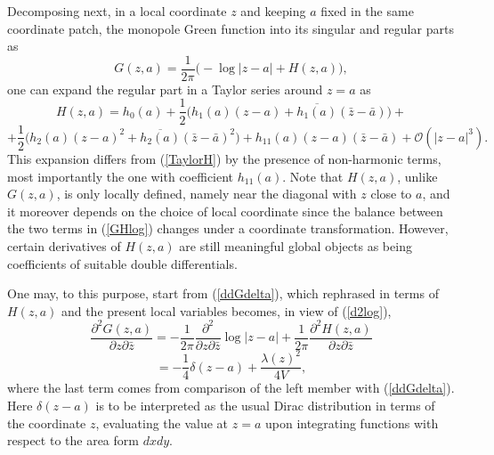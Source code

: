 \documentclass[reqno,12pt]{article}
\theoremstyle{plain}
\theoremstyle{definition}
\numberwithin{equation}{section}
\numberwithin{figure}{section}
\begin{document}
Decomposing next, in a local coordinate $z$ and keeping $a$ fixed in the same coordinate patch,  
the monopole Green function into its singular and regular parts as
\begin{equation}\label{GHlog}
G(z,a)=\frac{1}{2\pi}\Big(-\log |z-a|+H(z,a)\Big),
\end{equation}
one can expand the regular part in a Taylor series around $z=a$ as
\begin{equation}\label{HTaylor1}
H(z,a)=h_0(a)+\frac{1}{2}\Big(h_1(a)(z-a)+\overline{h_1(a)}(\bar{z}-\bar{a})\Big)+
\end{equation}
\begin{equation}\label{HTaylor2}
+\frac{1}{2}\Big(h_2(a)(z-a)^2+\overline{h_2(a)}(\bar{z}-\bar{a})^2\Big)+h_{11}(a)(z-a)(\bar{z}-\bar{a})+\mathcal{O}(|z-a|^3). 
\end{equation}
This expansion differs from (\ref{TaylorH}) by the presence of non-harmonic terms, 
most importantly the one with coefficient $h_{11}(a)$. 
Note that $H(z,a)$, unlike $G(z,a)$, is only locally defined, namely near the diagonal with $z$ close to $a$, and it moreover
depends on the choice of local coordinate since the balance between the two terms in (\ref{GHlog}) changes under a coordinate
transformation. 
However, certain derivatives of $H(z,a)$ are still meaningful global objects as being coefficients of suitable double differentials.

One may, to this purpose, start from (\ref{ddGdelta}), 
which rephrased in terms of $H(z,a)$ and the present local variables becomes, in view of (\ref{d2log}),
$$
\frac{\partial^2 G(z,a)}{\partial z \partial \bar{z}}
=-\frac{1}{2\pi}\frac{\partial^2}{\partial z\partial \bar{z}}\log |z-a|
+\frac{1}{2\pi}\frac{\partial^2 H(z,a)}{\partial z \partial \bar{z}}
$$
\begin{equation}\label{dzzG}  
= -\frac{1}{4}\delta (z-a)+\frac{\lambda (z)^2}{4V},
\end{equation}
where the last term comes from comparison of the left member with (\ref{ddGdelta}).
Here $\delta (z-a)$ is to be interpreted as the usual Dirac distribution in terms of the coordinate $z$,
evaluating the value at $z=a$ upon integrating functions 
with respect to the area form $dxdy$. 
\end{document}
